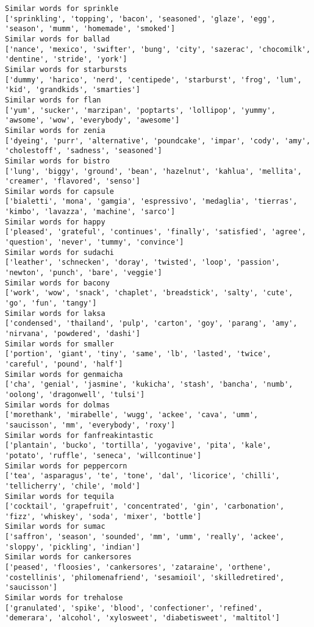 \documentclass[11pt]{article}
\begin{document}
\begin{Verbatim}[commandchars=\\\{\}]
Similar words for sprinkle
['sprinkling', 'topping', 'bacon', 'seasoned', 'glaze', 'egg', 'season', 'mumm', 'homemade', 'smoked']
Similar words for ballad
['nance', 'mexico', 'swifter', 'bung', 'city', 'sazerac', 'chocomilk', 'dentine', 'stride', 'york']
Similar words for starbursts
['dummy', 'harico', 'nerd', 'centipede', 'starburst', 'frog', 'lum', 'kid', 'grandkids', 'smarties']
Similar words for flan
['yum', 'sucker', 'marzipan', 'poptarts', 'lollipop', 'yummy', 'awsome', 'wow', 'everybody', 'awesome']
Similar words for zenia
['dyeing', 'purr', 'alternative', 'poundcake', 'impar', 'cody', 'amy', 'cholestoff', 'sadness', 'seasoned']
Similar words for bistro
['lung', 'biggy', 'ground', 'bean', 'hazelnut', 'kahlua', 'mellita', 'creamer', 'flavored', 'senso']
Similar words for capsule
['bialetti', 'mona', 'gamgia', 'espressivo', 'medaglia', 'tierras', 'kimbo', 'lavazza', 'machine', 'sarco']
Similar words for happy
['pleased', 'grateful', 'continues', 'finally', 'satisfied', 'agree', 'question', 'never', 'tummy', 'convince']
Similar words for sudachi
['leather', 'schnecken', 'doray', 'twisted', 'loop', 'passion', 'newton', 'punch', 'bare', 'veggie']
Similar words for bacony
['work', 'wow', 'snack', 'chaplet', 'breadstick', 'salty', 'cute', 'go', 'fun', 'tangy']
Similar words for laksa
['condensed', 'thailand', 'pulp', 'carton', 'goy', 'parang', 'amy', 'nirvana', 'powdered', 'dashi']
Similar words for smaller
['portion', 'giant', 'tiny', 'same', 'lb', 'lasted', 'twice', 'careful', 'pound', 'half']
Similar words for genmaicha
['cha', 'genial', 'jasmine', 'kukicha', 'stash', 'bancha', 'numb', 'oolong', 'dragonwell', 'tulsi']
Similar words for dolmas
['morethank', 'mirabelle', 'wugg', 'ackee', 'cava', 'umm', 'saucisson', 'mm', 'everybody', 'roxy']
Similar words for fanfreakintastic
['plantain', 'bucko', 'tortilla', 'yogavive', 'pita', 'kale', 'potato', 'ruffle', 'seneca', 'willcontinue']
Similar words for peppercorn
['tea', 'asparagus', 'te', 'tone', 'dal', 'licorice', 'chilli', 'tellicherry', 'chile', 'mold']
Similar words for tequila
['cocktail', 'grapefruit', 'concentrated', 'gin', 'carbonation', 'fizz', 'whiskey', 'soda', 'mixer', 'bottle']
Similar words for sumac
['saffron', 'season', 'sounded', 'mm', 'umm', 'really', 'ackee', 'sloppy', 'pickling', 'indian']
Similar words for cankersores
['peased', 'floosies', 'cankersores', 'zataraine', 'orthene', 'costellinis', 'philomenafriend', 'sesamioil', 'skilledretired', 'saucisson']
Similar words for trehalose
['granulated', 'spike', 'blood', 'confectioner', 'refined', 'demerara', 'alcohol', 'xylosweet', 'diabetisweet', 'maltitol']

\end{Verbatim}
\end{document}
